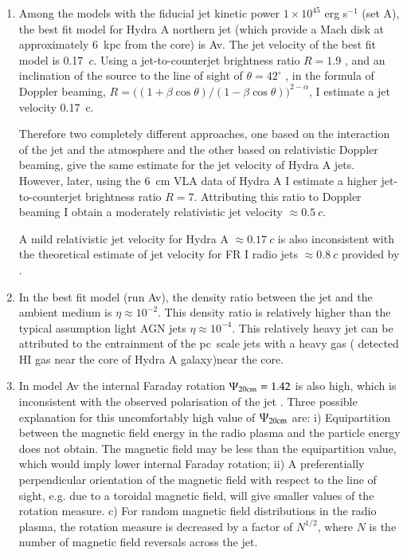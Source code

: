 \begin{enumerate}
\item Among the models with the fiducial jet kinetic power $1\times10^{45}$ erg s$^{-1}$ (set A), the best fit model for Hydra A northern jet (which provide a Mach disk at approximately 6~kpc from the core) is Av. The jet velocity of the best fit model is 0.17~$c$. Using a jet-to-counterjet brightness ratio $R=1.9$ \citep{taylor96}, and an inclination of the source to the line of sight of $\theta = 42^\circ$ \citep{taylor93}, in the formula of Doppler beaming, $R={((1+\beta \cos\theta)/(1-\beta \cos\theta)})^{2-\alpha}$, I estimate a jet velocity 0.17~c. 

Therefore two completely different approaches, one based on the interaction of the jet and the atmosphere and the other based on relativistic Doppler beaming, give the same estimate for the jet velocity of Hydra A jets. However, later, using the 6~cm VLA data of Hydra A I estimate a higher jet-to-counterjet brightness ratio $R = 7$. Attributing this ratio to Doppler beaming I obtain a moderately relativistic jet velocity $\approx 0.5~c$. 

A mild relativistic jet velocity for Hydra A $\approx 0.17~c$ is also inconsistent with the theoretical estimate of jet velocity for FR I radio jets $\approx 0.8~c$ provided by \citep{laing14}.


\item In the best fit model (run Av), the density ratio between the jet and the ambient medium is $\eta \approx 10^{-2}$. This density ratio is relatively higher than the typical assumption light AGN jets $\eta \approx 10^{-4}$. This relatively heavy jet can be attributed to the entrainment of the pc~scale jets with a heavy gas (\citet{dwarakanath95} detected HI gas near the core of Hydra A galaxy)near the core.

\item In model Av the internal Faraday rotation $\Psi_{20 \rm cm} = 1.42$ is also high, which is inconsistent with the observed polarisation of the jet \citep{taylor93}. Three possible explanation for this uncomfortably high value of $\Psi_{20 \rm cm}$ are: i) Equipartition between the magnetic field energy in the radio plasma and the particle energy does not obtain. The magnetic field may be less than the equipartition value, which would imply lower internal Faraday rotation; ii) A preferentially perpendicular orientation of the magnetic field with respect to the line of sight, e.g. due to a toroidal magnetic field, will give smaller values of the rotation measure. c) For random magnetic field distributions in the radio plasma, the rotation measure is decreased by a factor of $N^{1/2}$, where $N$ is the number of magnetic field reversals across the jet. 


\end{enumerate}
